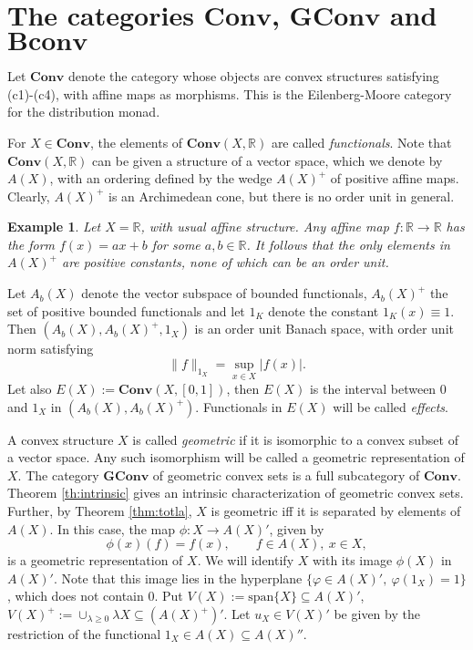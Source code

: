 \documentclass[12pt,letterpaper]{article}
\newtheorem{example}[lemma]{Example}
\newcommand{\ct}[1]{\mathbf{#1}}
\begin{document}
\section{The categories $\ct{Conv}$, $\ct{GConv}$ and $\ct{Bconv}$}


Let $\ct{Conv}$ denote the category whose objects are convex structures satisfying (c1)-(c4), with affine maps as morphisms. This is the Eilenberg-Moore category for the distribution monad.

For $X\in \ct{Conv}$, the elements of $\ct{Conv}(X,\mathbb R)$ are called \emph{functionals}.
 Note that $\ct{Conv}(X,\mathbb R)$ can be given a structure of a vector space, which we denote by $A(X)$, with an ordering defined by the wedge $A(X)^+$ of positive affine maps. Clearly, $A(X)^+$ is an Archimedean cone, but there is no order unit in general.

\begin{example} Let $X=\mathbb R$, with usual affine structure. Any affine map $f:\mathbb R\to \mathbb R$ has the form $f(x)=ax+b$ for some $a,b\in \mathbb R$. It follows that the only elements in $A(X)^+$ are positive constants, none of which can be an order unit. 

\end{example}

Let $A_b(X)$ denote the vector subspace of bounded functionals, $A_b(X)^+$ the set of positive bounded functionals and let $1_K$ denote the constant $1_K(x)\equiv 1$. 
Then $(A_b(X),A_b(X)^+,1_X)$ is an  order unit Banach space, with order unit norm satisfying
\[
\|f\|_{1_X}=\sup_{x\in X} |f(x)|.
\]
Let also $E(X):=\ct{Conv}(X,[0,1])$, then $E(X)$ is the interval between 0 and $1_X$ in $(A_b(X),A_b(X)^+)$. Functionals in  $E(X)$ will be called \emph{effects}.





A convex structure $X$ is called \emph{geometric} if it is isomorphic to a convex subset of a vector space. Any such isomorphism will be called a geometric representation of $X$. The category $\ct{GConv}$ of geometric convex sets is a full subcategory of $\ct{Conv}$. Theorem \ref{th:intrinsic} gives an intrinsic characterization of geometric convex sets. Further, by Theorem \ref{thm:totla}, $X$ is geometric iff it is separated by elements of $A(X)$. In this case, the map $\phi: X\to A(X)'$, given by
\[
\phi(x)(f)=f(x),\qquad f\in A(X),\ x\in X,
\]
is a geometric representation of $X$.  We will identify $X$ with its image $\phi(X)$ in $A(X)'$.  Note that this image lies in the hyperplane $\{ \varphi\in A(X)',\ \varphi(1_X)=1\}$, which does not contain 0. 
  Put  $V(X):=\mathrm{span}\{X\}\subseteq A(X)'$, $V(X)^+:=\cup_{\lambda\ge 0} \lambda X\subseteq (A(X)^+)'$. Let $u_X\in V(X)'$ be given by the restriction of the functional $1_X\in A(X)\subseteq A(X)''$.
\end{document}
